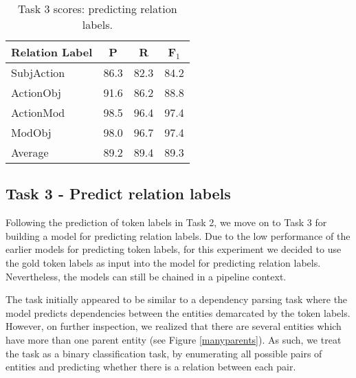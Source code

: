 \documentclass[11pt,a4paper]{article}
\begin{document}
\begin{table}[t]
\begin{center}
\small
{\def\arraystretch{1.125}\tabcolsep=3.5pt
\begin{tabular}{l | c | c | c }
\hline 
\bf Relation Label & \bf P & \bf R & \bf F$_{1}$ \\ 
\hline
SubjAction & 86.3 & 82.3 & 84.2 \\
ActionObj & 91.6 & 86.2 & 88.8 \\
ActionMod & 98.5 & 96.4 & 97.4 \\
ModObj & 98.0 & 96.7 & 97.4 \\
\hline
Average & 89.2 & 89.4 & 89.3 \\
\hline
\end{tabular}
}
\end{center}
\caption{\label{t3_scores} Task 3 scores: predicting relation labels.}
\vspace{-2mm}
\end{table}




\subsection{Task 3 - Predict relation labels}
\label{task3}

Following the prediction of token labels in Task 2, we move on to Task 3 for building a model for predicting relation labels. Due to the low performance of the earlier models for predicting token labels, for this experiment we decided to use the gold token labels as input into the model for predicting relation labels. Nevertheless, the models can still be chained in a pipeline context.

The task initially appeared to be similar to a dependency parsing task where the model predicts dependencies between the entities demarcated by the token labels. However, on further inspection, we realized that there are several entities which have more than one parent entity (see Figure \ref{manyparents}). As such, we treat the task as a binary classification task, by enumerating all possible pairs of entities and predicting whether there is a relation between each pair.
\end{document}
